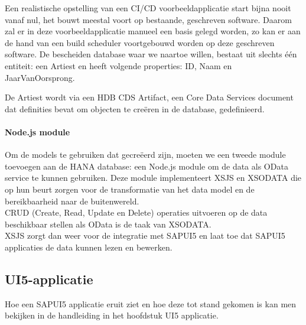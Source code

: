             
            Een realistische opstelling van een CI/CD voorbeeldapplicatie start bijna nooit vanaf nul, het bouwt meestal voort op bestaande, geschreven software.
            Daarom zal er in deze voorbeeldapplicatie manueel een basis gelegd worden, zo kan er aan de hand van een build scheduler voortgebouwd worden op deze geschreven software.
            De bescheiden database waar we naartoe willen, bestaat uit slechts één entiteit: een Artiest en heeft volgende properties: ID, Naam en JaarVanOorsprong.
            
            De Artiest wordt via een HDB CDS Artifact, een Core Data Services document dat definities bevat om objecten te creëren in de database, gedefinieerd.
           
            \paragraph{Node.js module}
            Om de models te gebruiken dat gecreëerd zijn, moeten we een tweede module toevoegen aan de HANA database: een Node.js module om de data als OData service te kunnen gebruiken.
            Deze module implementeert XSJS en XSODATA die op hun beurt zorgen voor de transformatie van het data model en de bereikbaarheid naar de buitenwereld.\\
            CRUD (Create, Read, Update en Delete) operaties uitvoeren op de data beschikbaar stellen als OData is de taak van XSODATA.\\
            XSJS zorgt dan weer voor de integratie met SAPUI5 en laat toe dat SAPUI5 applicaties de data kunnen lezen en bewerken.

            
        \subsection{UI5-applicatie}
        Hoe een SAPUI5 applicatie eruit ziet en hoe deze tot stand gekomen is kan men bekijken in de handleiding in het hoofdstuk UI5 applicatie.